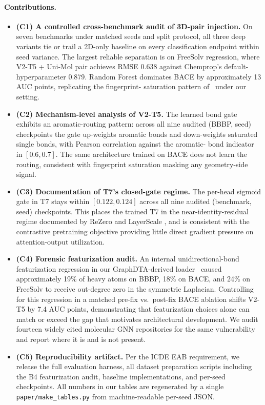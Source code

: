 \paragraph{Contributions.}
\begin{itemize}
\item \textbf{(C1) A controlled cross-benchmark audit of 3D-pair injection.}
On seven benchmarks under matched seeds and split protocol, all three
deep variants tie or trail a 2D-only baseline on every classification
endpoint within seed variance. The largest reliable separation is on
FreeSolv regression, where V2-T5 + Uni-Mol pair achieves RMSE 0.638
against Chemprop's default-hyperparameter 0.879. Random Forest dominates
BACE by approximately 13 AUC points, replicating the fingerprint-
saturation pattern of~\cite{deng2023systematic} under our setting.

\item \textbf{(C2) Mechanism-level analysis of V2-T5.} The learned bond
gate exhibits an aromatic-routing pattern: across all nine audited (BBBP,
seed) checkpoints the gate up-weights aromatic bonds and down-weights
saturated single bonds, with Pearson correlation against the aromatic-
bond indicator in $[0.6, 0.7]$. The same architecture trained on BACE
does not learn the routing, consistent with fingerprint saturation
masking any geometry-side signal.

\item \textbf{(C3) Documentation of T7's closed-gate regime.} The
per-head sigmoid gate in T7 stays within $[0.122, 0.124]$ across all nine
audited (benchmark, seed) checkpoints. This places the trained T7 in the
near-identity-residual regime documented by ReZero
\cite{bachlechner2021rezero} and LayerScale \cite{touvron2021cait}, and is
consistent with the contrastive pretraining objective providing little
direct gradient pressure on attention-output utilization.

\item \textbf{(C4) Forensic featurization audit.} An internal
unidirectional-bond featurization regression in our GraphDTA-derived
loader~\cite{nguyen2021graphdta} caused approximately 19\% of heavy atoms
on BBBP, 18\% on BACE, and 24\% on FreeSolv to receive out-degree zero in
the symmetric Laplacian. Controlling for this regression in a matched
pre-fix vs.\ post-fix BACE ablation shifts V2-T5 by 7.4 AUC points,
demonstrating that featurization choices alone can match or exceed the
gap that motivates architectural development. We audit fourteen widely
cited molecular GNN repositories for the same vulnerability and report
where it is and is not present.

\item \textbf{(C5) Reproducibility artifact.} Per the ICDE EAB requirement,
we release the full evaluation harness, all dataset preparation scripts
including the B4 featurization audit, baseline implementations, and
per-seed checkpoints. All numbers in our tables are regenerated by a
single \texttt{paper/make\_tables.py} from machine-readable per-seed JSON.
\end{itemize}

